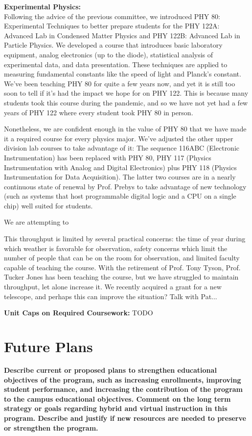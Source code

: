 \documentclass[12pt]{article}
\begin{document}
\noindent
{\bf Experimental Physics:}\\ Following the advice of the previous
committee, we introduced PHY 80: Experimental Techniques to better
prepare students for the PHY 122A: Advanced Lab in Condensed Matter
Physics and PHY 122B: Advanced Lab in Particle Physics.  We developed
a course that introduces basic laboratory equipment, analog
electronics (up to the diode), statistical analysis of experimental
data, and data presentation.  These techniques are applied to
measuring fundamental constants like the speed of light and Planck's
constant.  We've been teaching PHY 80 for quite a few years now, and
yet it is still too soon to tell if it's had the impact we hope for on
PHY 122.  This is because many students took this course during the
pandemic, and so we have not yet had a few years of PHY 122 where
every student took PHY 80 in person.

Nonetheless, we are confident enough in the value of PHY 80 that we
have made it a required course for every physics major.  We've
adjusted the other upper division lab courses to take advantage of it:
The sequence 116ABC (Electronic Instrumentation) has been replaced
with PHY 80, PHY 117 (Physics Instrumentation with Analog and Digital
Electronics) plus PHY 118 (Physics Instrumentation for Data Acquisition).
The latter two courses are in a nearly continuous state of renewal by
Prof. Prebys to take advantage of new technology (such as systems that
host programmable digital logic and a CPU on a single chip) well suited for
students.

We are attempting to 



This throughput is limited by several
practical concerns: the time of year during which weather is favorable
for observation, safety concerns which limit the number of people
that can be on the room for observation, and limited faculty capable
of teaching the course.  With the retirement of Prof. Tony Tyson,
Prof. Tucker Jones has been teaching the course, but we have struggled
to maintain throughput, let alone increase it.  We recently acquired a
grant for a new telescope, and perhaps this can improve the situation?
Talk with Pat...

{\bf Unit Caps on Required Coursework:} {\color{red} TODO}


\newpage
\section{Future Plans}
{\bf Describe current or proposed plans to strengthen educational
objectives of the program, such as increasing enrollments, improving
student performance, and increasing the contribution of the program to
the campus educational objectives. Comment on the long term strategy
or goals regarding hybrid and virtual instruction in this
program. Describe and justify if new resources are needed to preserve
or strengthen the program.}
\end{document}

